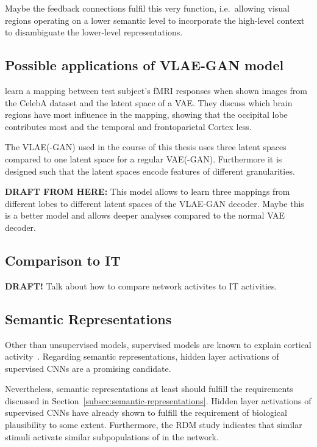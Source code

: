 Maybe the feedback connections fulfil this very function, i.e.\ allowing visual regions operating on a lower semantic level to incorporate the high-level context to disambiguate the lower-level representations.

\subsection{Possible applications of VLAE-GAN model}
\citet{vanrullen2019reconstructing} learn a mapping between test subject's fMRI responses when shown images from the CelebA dataset and the latent space of a \ac{VAE}.
They discuss which brain regions have most influence in the mapping, showing that the occipital lobe contributes most and the temporal and frontoparietal Cortex less.

The \ac{VLAE}(-\ac{GAN}) used in the course of this thesis uses three latent spaces compared to one latent space for a regular \ac{VAE}(-\ac{GAN}).
Furthermore it is designed such that the latent spaces encode features of different granularities.

\textbf{DRAFT FROM HERE:}
This model allows to learn three mappings from different lobes to different latent spaces of the VLAE-GAN decoder.
Maybe this is a better model and allows deeper analyses compared to the normal VAE decoder.

\subsection{Comparison to \ac{IT}}
\textbf{DRAFT!}
Talk about how to compare network activites to IT activities.

\subsection{Semantic Representations}\label{subsec:semantic-representations-results}
Other than unsupervised models, supervised models are known to explain cortical activity~\citep{khaligh2014deep,cadieu2014deep}.
Regarding semantic representations, hidden layer activations of supervised \acp{CNN} are a promising candidate.

Nevertheless, semantic representations at least should fulfill the requirements discussed in Section~\ref{subsec:semantic-representations}.
Hidden layer activations of supervised \acp{CNN} have already shown to fulfill the requirement of biological plausibility to some extent.
Furthermore, the \ac{RDM} study indicates that similar stimuli activate similar subpopulations of  in the network.

